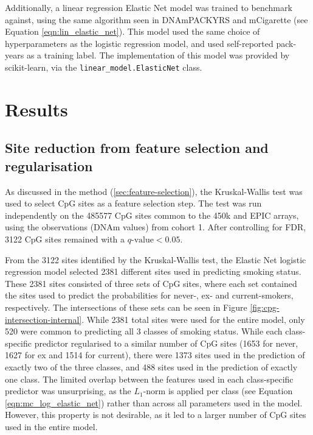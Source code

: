 \documentclass{article} %
\begin{document}
Additionally, a linear regression Elastic Net model was trained to benchmark against, using the same algorithm seen in DNAmPACKYRS and mCigarette (see Equation \ref{eqn:lin_elastic_net}). This model used the same choice of hyperparameters as the logistic regression model, and used self-reported pack-years as a training label. The implementation of this model was provided by scikit-learn, via the \verb|linear_model.ElasticNet| class.

\newpage
\section{Results} \label{sec:results}

\subsection{Site reduction from feature selection and regularisation}
As discussed in the method (\ref{sec:feature-selection}), the Kruskal-Wallis test was used to select CpG sites as a feature selection step. The test was run independently on the \num{485577} CpG sites common to the 450k and EPIC arrays, using the observations (DNAm values) from cohort 1. After controlling for FDR, \num{3122} CpG sites remained with a \(q\text{-value} < 0.05\).

From the \num{3122} sites identified by the Kruskal-Wallis test, the Elastic Net logistic regression model selected \num{2381} different sites used in predicting smoking status. These \num{2381} sites consisted of three sets of CpG sites, where each set contained the sites used to predict the probabilities for never-, ex- and current-smokers, respectively.
The intersections of these sets can be seen in Figure \ref{fig:cpg-intersection-internal}. While \num{2381} total sites were used for the entire model, only \num{520} were common to predicting all 3 classes of smoking status. While each class-specific predictor regularised to a similar number of CpG sites (\num{1653} for never, \num{1627} for ex and \num{1514} for current), there were \num{1373} sites used in the prediction of exactly two of the three classes, and \num{488} sites used in the prediction of exactly one class. The limited overlap between the features used in each class-specific predictor was unsurprising, as the \(L_1\)-norm is applied per class (see Equation \ref{eqn:mc_log_elastic_net}) rather than across all parameters used in the model. However, this property is not desirable, as it led to a larger number of CpG sites used in the entire model.
\end{document}

